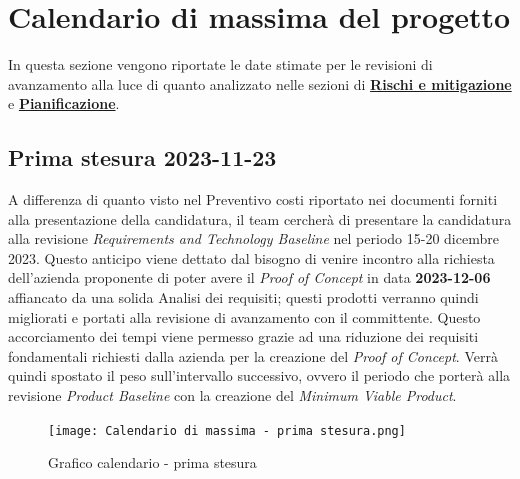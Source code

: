 \documentclass[10pt, a4paper]{article}
\begin{document}
{{{{{{\newpage

\section{Calendario di massima del progetto}
In questa sezione vengono riportate le date stimate per le revisioni di avanzamento alla luce di quanto analizzato nelle sezioni di \hyperref[section:Rischi]{\textbf{Rischi e mitigazione}} e \hyperref[section:Pianificazione]{\textbf{Pianificazione}}.

\subsection{Prima stesura 2023-11-23}
A differenza di quanto visto nel Preventivo costi riportato nei documenti forniti alla presentazione della candidatura, il team cercherà di presentare la candidatura alla revisione \textit{Requirements and Technology Baseline} nel periodo 15-20 dicembre 2023. Questo anticipo viene dettato dal bisogno di venire incontro alla richiesta dell'azienda proponente di poter avere il \textit{Proof of Concept} in data \textbf{2023-12-06} affiancato da una solida Analisi dei requisiti; questi prodotti verranno quindi migliorati e portati alla revisione di avanzamento con il committente.
 Questo accorciamento dei tempi viene permesso grazie ad una riduzione dei requisiti fondamentali richiesti dalla azienda per la creazione del \textit{Proof of Concept}. Verrà quindi spostato il peso sull'intervallo successivo, ovvero il periodo che porterà alla revisione \textit{Product Baseline} con la creazione del \textit{Minimum Viable Product}.

 \begin{figure}[H]
        \centering
        \texttt{[image: Calendario di massima - prima stesura.png]}
        \caption{Grafico calendario - prima stesura}
    \end{figure}

}}}}}}
\end{document}
